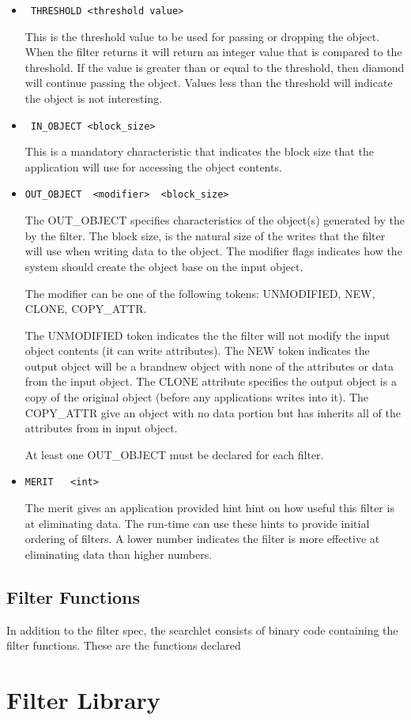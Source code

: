 \begin{itemize}
\item \begin{verbatim} THRESHOLD <threshold value> \end{verbatim}

This is the threshold value to be used for passing or dropping the object.
When the filter returns it will return an integer value that is compared
to the threshold.  If the value is greater than or equal to the threshold,
then diamond will continue passing the object.  Values less than
the threshold will indicate the object is not interesting.


\item \begin{verbatim} IN_OBJECT <block_size> \end{verbatim}

This is a mandatory characteristic that indicates the block size that
the application will use for accessing the object contents.

\item \verb#OUT_OBJECT	<modifier>	<block_size>#

The OUT\_OBJECT specifies characteristics of the object(s) generated by the 
by the filter.  The block size, is the natural size of the writes
that the filter will use when writing data to the object. The 
modifier flags indicates how the system should create the object
base on the input object.   


The modifier can be one of the following tokens: UNMODIFIED, NEW, CLONE,
COPY\_ATTR.

The UNMODIFIED token indicates the the filter will not modify
the input object contents (it can write attributes).  The
NEW token indicates the output object will be a brandnew object with
none of the attributes or data from the input object.
The CLONE attribute specifies the output object is a copy
of the original object (before any applications writes into
it).  The COPY\_ATTR give an object with no data portion but
has inherits all of the attributes from in input object. 

At least one OUT\_OBJECT must be declared for each filter.

\item \verb#MERIT	<int>#

The merit gives an application provided hint hint on how useful
this filter is at eliminating data.  The run-time can use
these hints to provide initial ordering of filters. A lower number
indicates the filter is more effective at eliminating data
than higher numbers. 

\end{itemize}
\subsection{Filter Functions}

In addition to the filter spec, the searchlet consists of binary code
containing the filter functions.  These are the functions declared




\section{Filter Library}






